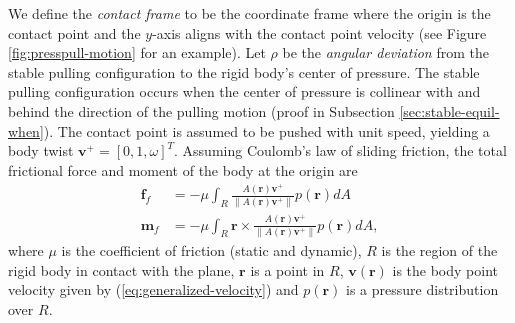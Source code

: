 \documentclass[conference]{IEEEtran}
\DeclareMathOperator{\sign}{\text{sgn}}
\newcommand{\EH}[1]{{\color{blue} {Eric: {#1}}  }}
\begin{document}
We define the \textit{contact frame} to be the coordinate frame where
the origin is the contact point and the $y$-axis aligns with the
contact point velocity (see Figure \ref{fig:presspull-motion} for an
example).  Let $\rho$ be the \textit{angular deviation} from the
stable pulling configuration to the rigid body's center of
pressure. The stable pulling configuration occurs when the center of
pressure is collinear with and behind the direction of the pulling
motion (proof in Subsection \ref{sec:stable-equil-when}). The contact
point is assumed to be pushed with unit speed, yielding a body twist
$\mathbf{v}^+ = [0,1,\omega]^T$.  Assuming Coulomb's law of sliding
friction, the total frictional force and moment of the body at the
origin are
\begin{align}
  \mathbf{f}_f &= -\mu\int_{R}\frac{A(\mathbf{r})\mathbf{v}^+}{\lVert A(\mathbf{r})\mathbf{v}^+ \rVert} p(\mathbf{r}) dA \label{eq:force-at-contact} \\
  \mathbf{m}_f &= -\mu\int_{R}\mathbf{r}\times\frac{A(\mathbf{r})\mathbf{v}^+}{\lVert A(\mathbf{r})\mathbf{v}^+ \rVert} p(\mathbf{r}) dA, \label{eq:moment-at-contact}
\end{align}
where $\mu$ is the coefficient of friction (static and dynamic), $R$
is the region of the rigid body in contact with the plane,
$\mathbf{r}$ is a point in $R$, $\mathbf{v}(\mathbf{r})$ is the body
point velocity given by (\ref{eq:generalized-velocity}) and
$p(\mathbf{r})$ is a pressure distribution over $R$.
\end{document}
